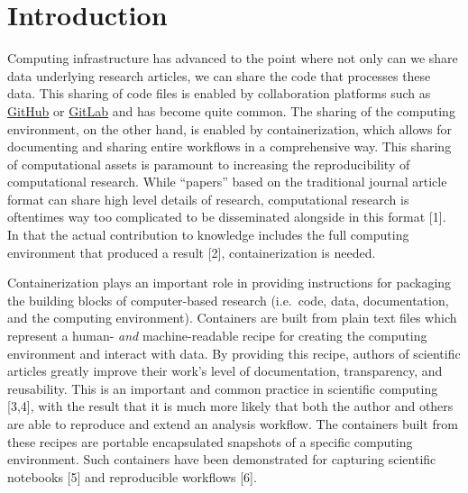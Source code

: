 \documentclass[10pt,letterpaper]{article}
\begin{document}

\linenumbers

\hypertarget{introduction}{%
\section*{Introduction}\label{introduction}}

Computing infrastructure has advanced to the point where not only can we
share data underlying research articles, we can share the code that
processes these data. This sharing of code files is enabled by
collaboration platforms such as \href{https://github.com}{GitHub} or
\href{https://gitlab.com}{GitLab} and has become quite common. The
sharing of the computing environment, on the other hand, is enabled by
containerization, which allows for documenting and sharing entire
workflows in a comprehensive way. This sharing of computational assets
is paramount to increasing the reproducibility of computational
research. While ``papers'' based on the traditional journal article
format can share high level details of research, computational research
is oftentimes way too complicated to be disseminated alongside in this
format {[}1{]}. In that the actual contribution to knowledge includes
the full computing environment that produced a result {[}2{]},
containerization is needed.

Containerization plays an important role in providing instructions for
packaging the building blocks of computer-based research (i.e.~code,
data, documentation, and the computing environment). Containers are
built from plain text files which represent a human- \emph{and}
machine-readable recipe for creating the computing environment and
interact with data. By providing this recipe, authors of scientific
articles greatly improve their work's level of documentation,
transparency, and reusability. This is an important and common practice
in scientific computing {[}3,4{]}, with the result that it is much more
likely that both the author and others are able to reproduce and extend
an analysis workflow. The containers built from these recipes are
portable encapsulated snapshots of a specific computing environment.
Such containers have been demonstrated for capturing scientific
notebooks {[}5{]} and reproducible workflows {[}6{]}.
\end{document}
